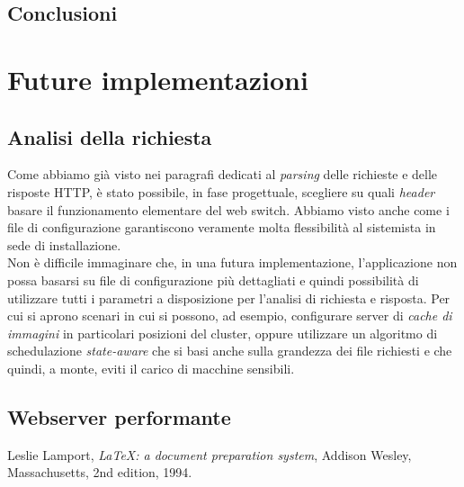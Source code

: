 \documentclass[italian]{tktltiki2}
\begin{document}
\subsection{Conclusioni}
\newpage
\section{Future implementazioni}
\subsection{Analisi della richiesta}
Come abbiamo già visto nei paragrafi dedicati al \emph{parsing} delle richieste e delle risposte HTTP, è stato possibile, in fase progettuale, scegliere su quali \emph{header} basare il funzionamento elementare del web switch. Abbiamo visto anche come i file di configurazione garantiscono veramente molta flessibilità al sistemista in sede di installazione. \\
Non è difficile immaginare che, in una futura implementazione, l'applicazione non possa basarsi su file di configurazione più dettagliati e quindi possibilità di utilizzare tutti i parametri a disposizione per l'analisi di richiesta e risposta. Per cui si aprono scenari in cui si possono, ad esempio, configurare server di \emph{cache di immagini} in particolari posizioni del cluster, oppure utilizzare un algoritmo di schedulazione \emph{state-aware} che si basi anche sulla grandezza dei file richiesti e che quindi, a monte, eviti il carico di macchine sensibili.
\subsection{Webserver performante}


%
%
% 
%


\newpage
%
%
\renewcommand{\refname}{\normalfont\selectfont\normalsize\textbf{Annotazioni}} 
\begin{thebibliography}{9}
  Leslie Lamport,
  \emph{\LaTeX: a document preparation system},
  Addison Wesley, Massachusetts,
  2nd edition,
  1994.
  
\end{thebibliography}
\end{document}
